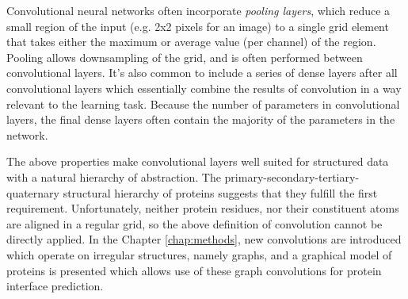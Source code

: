 Convolutional neural networks often incorporate \textit{pooling layers}, which reduce a small region of the input (e.g. 2x2 pixels for an image) to a single grid element that takes either the maximum or average value (per channel) of the region. 
Pooling allows downsampling of the grid, and is often performed between convolutional layers. 
It's also common to include a series of dense layers after all convolutional layers which essentially combine the results of convolution in a way relevant to the learning task.
Because the number of parameters in convolutional layers, the final dense layers often contain the majority of the parameters in the network.


 The above properties make convolutional layers well suited for structured data with a natural hierarchy of abstraction.
 The primary-secondary-tertiary-quaternary structural hierarchy of proteins suggests that they fulfill the first requirement.
 Unfortunately, neither protein residues, nor their constituent atoms are aligned in a regular grid, so the above definition of convolution cannot be directly applied. 
 In the Chapter \ref{chap:methods}, new convolutions are introduced which operate on irregular structures, namely graphs, and a graphical model of proteins is presented which allows use of these graph convolutions for protein interface prediction. 